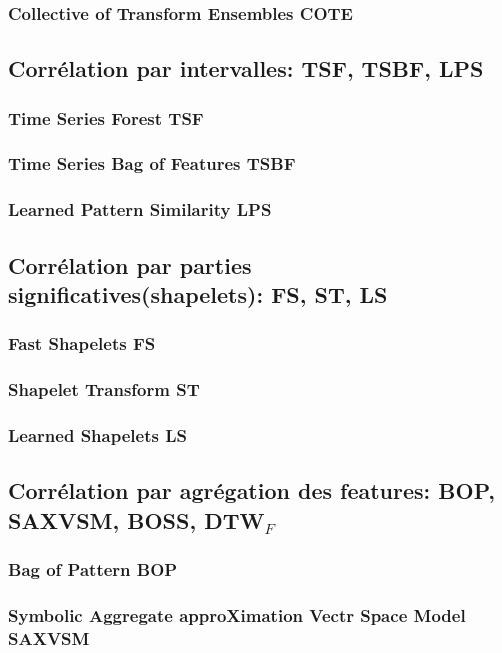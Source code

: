 			\subsubsection{Collective of Transform Ensembles COTE}
			\subsubsection{}
		\subsection{Corr\'elation par intervalles: TSF, TSBF, LPS}
			\subsubsection{Time Series Forest TSF}
			\subsubsection{Time Series Bag of Features TSBF}
			\subsubsection{Learned Pattern Similarity LPS}
		\subsection{Corr\'elation par parties significatives(shapelets): FS, ST, LS}
			\subsubsection{Fast Shapelets FS}
			\subsubsection{Shapelet Transform ST}
			\subsubsection{Learned Shapelets LS}
		\subsection{Corr\'elation par agr\'egation des features: BOP, SAXVSM, BOSS,  DTW$_{F}$}
			\subsubsection{Bag of Pattern BOP}
			\subsubsection{Symbolic Aggregate approXimation Vectr Space Model SAXVSM}
